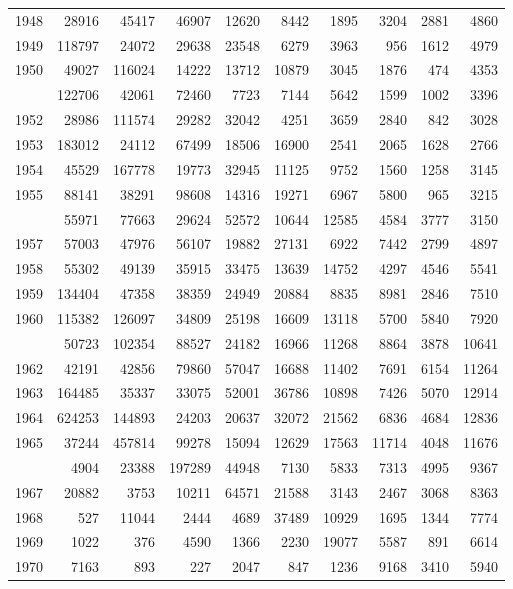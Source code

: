 \documentclass[
]{article}
\begin{document}
\begin{longtable}[t]{lrrrrrrrrr}
1948 & 28916 & 45417 & 46907 & 12620 & 8442 & 1895 & 3204 & 2881 & 4860\\
1949 & 118797 & 24072 & 29638 & 23548 & 6279 & 3963 & 956 & 1612 & 4979\\
1950 & 49027 & 116024 & 14222 & 13712 & 10879 & 3045 & 1876 & 474 & 4353\\
\addlinespace
1951 & 122706 & 42061 & 72460 & 7723 & 7144 & 5642 & 1599 & 1002 & 3396\\
1952 & 28986 & 111574 & 29282 & 32042 & 4251 & 3659 & 2840 & 842 & 3028\\
1953 & 183012 & 24112 & 67499 & 18506 & 16900 & 2541 & 2065 & 1628 & 2766\\
1954 & 45529 & 167778 & 19773 & 32945 & 11125 & 9752 & 1560 & 1258 & 3145\\
1955 & 88141 & 38291 & 98608 & 14316 & 19271 & 6967 & 5800 & 965 & 3215\\
\addlinespace
1956 & 55971 & 77663 & 29624 & 52572 & 10644 & 12585 & 4584 & 3777 & 3150\\
1957 & 57003 & 47976 & 56107 & 19882 & 27131 & 6922 & 7442 & 2799 & 4897\\
1958 & 55302 & 49139 & 35915 & 33475 & 13639 & 14752 & 4297 & 4546 & 5541\\
1959 & 134404 & 47358 & 38359 & 24949 & 20884 & 8835 & 8981 & 2846 & 7510\\
1960 & 115382 & 126097 & 34809 & 25198 & 16609 & 13118 & 5700 & 5840 & 7920\\
\addlinespace
1961 & 50723 & 102354 & 88527 & 24182 & 16966 & 11268 & 8864 & 3878 & 10641\\
1962 & 42191 & 42856 & 79860 & 57047 & 16688 & 11402 & 7691 & 6154 & 11264\\
1963 & 164485 & 35337 & 33075 & 52001 & 36786 & 10898 & 7426 & 5070 & 12914\\
1964 & 624253 & 144893 & 24203 & 20637 & 32072 & 21562 & 6836 & 4684 & 12836\\
1965 & 37244 & 457814 & 99278 & 15094 & 12629 & 17563 & 11714 & 4048 & 11676\\
\addlinespace
1966 & 4904 & 23388 & 197289 & 44948 & 7130 & 5833 & 7313 & 4995 & 9367\\
1967 & 20882 & 3753 & 10211 & 64571 & 21588 & 3143 & 2467 & 3068 & 8363\\
1968 & 527 & 11044 & 2444 & 4689 & 37489 & 10929 & 1695 & 1344 & 7774\\
1969 & 1022 & 376 & 4590 & 1366 & 2230 & 19077 & 5587 & 891 & 6614\\
1970 & 7163 & 893 & 227 & 2047 & 847 & 1236 & 9168 & 3410 & 5940\\

\end{longtable}
\end{document}
